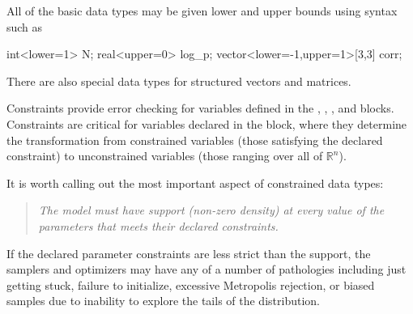 All of the basic data types may be given lower and upper bounds using
syntax such as
%
\begin{stancode}
int<lower=1> N;
real<upper=0> log_p;
vector<lower=-1,upper=1>[3,3] corr;
\end{stancode}

There are also special data types for structured vectors and
matrices.

Constraints provide error checking for variables defined in the ,
, , and 
 blocks.
%
Constraints are critical for variables declared in the
 block, where they determine the transformation from
constrained variables (those satisfying the declared constraint) to
unconstrained variables (those ranging over all of $\mathbb{R}^n$).

It is worth calling out the most important aspect of constrained data
types: 
%
\begin{quote}
\it
The model must have support (non-zero density) at every value of the
parameters that meets their declared constraints.
\end{quote}
%
If the declared parameter constraints are less strict than the
support, the samplers and optimizers may have any of a number of
pathologies including just getting stuck, failure to initialize,
excessive Metropolis rejection, or biased samples due to inability to
explore the tails of the distribution.


